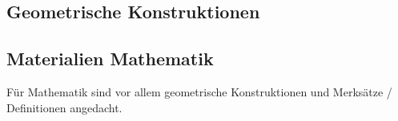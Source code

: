 \subsection{Geometrische Konstruktionen}\label{sec:geometrie}

\subsection{Materialien Mathematik}\label{sec:materialmathe}
Für Mathematik sind vor allem geometrische Konstruktionen und Merksätze / Definitionen angedacht. 